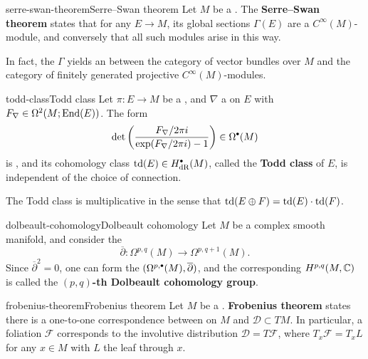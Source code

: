 \begin{topic}{serre-swan-theorem}{Serre--Swan theorem}
    Let $M$ be a  . The \textbf{Serre--Swan theorem} states that for any  $E \to M$, its global sections $\Gamma(E)$ are a   $C^\infty(M)$-module, and conversely that all such modules arise in this way.
    
    In fact, the  $\Gamma$ yields an  between the category of vector bundles over $M$ and the category of finitely generated projective $C^\infty(M)$-modules.
\end{topic}

\begin{topic}{todd-class}{Todd class}
    Let $\pi \colon E \to M$ be a , and $\nabla$ a  on $E$ with  $F_\nabla \in \Omega^2(M; \textup{End}(E))$. The form
    \[ \det\left(\frac{F_\nabla / 2 \pi i}{\exp(F_\nabla / 2 \pi i) - 1}\right) \in \Omega^\bdot(M) \]
    is , and its cohomology class $\textup{td}(E) \in H^\bdot_\textup{dR}(M)$, called the \textbf{Todd class} of $E$, is independent of the choice of connection.
    
    The Todd class is multiplicative in the sense that $\textup{td}(E \oplus F) = \textup{td}(E) \cdot \textup{td}(F)$.
\end{topic}

\begin{topic}{dolbeault-cohomology}{Dolbeault cohomology}
    Let $M$ be a complex smooth manifold, and consider the 
    \[ \overline{\partial} \colon \Omega^{p, q}(M) \to \Omega^{p, q + 1}(M) . \]
    Since $\overline{\partial}^2 = 0$, one can form the  $(\Omega^{p, \bdot}(M), \overline{\partial})$, and the corresponding  $H^{p, q}(M, \mathbb{C})$ is called the \textbf{$(p, q)$-th Dolbeault cohomology group}.
\end{topic}

\begin{topic}{frobenius-theorem}{Frobenius theorem}
    Let $M$ be a . \textbf{Frobenius theorem} states there is a one-to-one correspondence between  on $M$ and  $\mathcal{D} \subset TM$. In particular, a foliation $\mathcal{F}$ corresponds to the involutive distribution $\mathcal{D} = T \mathcal{F}$, where $T_x \mathcal{F} = T_x L$ for any $x \in M$ with $L$ the leaf through $x$.
\end{topic}

